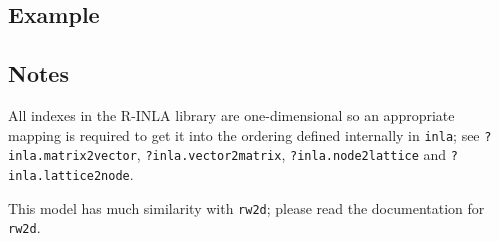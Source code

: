 \documentclass[a4paper,11pt]{article}
\begin{document}
\subsection*{Example}



\subsection*{Notes}
All indexes in the R-INLA library are one-dimensional so an
appropriate mapping is required to get it into the ordering defined
internally in \verb|inla|; see \verb|?inla.matrix2vector|,
\verb|?inla.vector2matrix|, \verb|?inla.node2lattice| and
\verb|?inla.lattice2node|.

This model has much similarity with \verb|rw2d|; please read the
documentation for \verb|rw2d|.

{\small}
\end{document}
